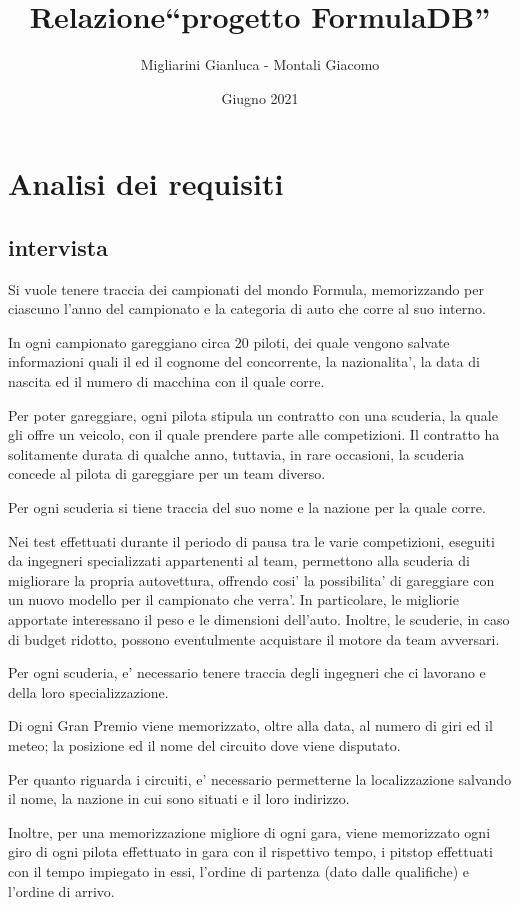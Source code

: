 \documentclass[a4paper,12pt]{report}
\title{Relazione\break``progetto FormulaDB''}
\author{Migliarini Gianluca - Montali Giacomo}
\date{Giugno 2021}
\begin{document}
	
\maketitle
\chapter{Analisi dei requisiti}
	\section{intervista}
		Si vuole tenere traccia dei campionati del mondo Formula, memorizzando per ciascuno l'anno del campionato e la categoria di auto che corre al suo interno.
		
		In ogni campionato gareggiano circa 20 piloti, dei quale vengono salvate informazioni quali il ed il cognome del concorrente,
		la nazionalita', la data di nascita ed il numero di macchina con il quale corre.
		
		Per poter gareggiare, ogni pilota stipula un contratto con una scuderia, la quale gli offre un veicolo, con il quale
		prendere parte alle competizioni. Il contratto ha solitamente durata di qualche anno, tuttavia, in rare occasioni,
		la scuderia concede al pilota di gareggiare per un team diverso.
		
		Per ogni scuderia si tiene traccia del suo nome e la nazione per la quale corre.
		
		Nei test effettuati durante il periodo di pausa tra le varie competizioni, eseguiti da ingegneri specializzati appartenenti al team,
		permettono alla scuderia di migliorare la propria autovettura, offrendo cosi' la possibilita' di gareggiare
		con un nuovo modello per il campionato che verra'. In particolare, le migliorie apportate interessano il peso e le dimensioni dell'auto.
		Inoltre, le scuderie, in caso di budget ridotto, possono eventulmente acquistare il motore da team avversari.
		
		Per ogni scuderia, e' necessario tenere traccia degli ingegneri che ci lavorano e della loro specializzazione.
		
		Di ogni Gran Premio viene memorizzato, oltre alla data, al numero di giri ed il meteo;
		la posizione ed il nome del circuito dove viene disputato.
		
		Per quanto riguarda i circuiti, e' necessario permetterne la localizzazione salvando il nome, la nazione in cui sono situati e il loro indirizzo.
		
		Inoltre, per una memorizzazione migliore di ogni gara, viene memorizzato ogni giro di ogni pilota effettuato in gara con il rispettivo tempo,
		i pitstop effettuati con il tempo impiegato in essi, l'ordine di partenza (dato dalle qualifiche) e l'ordine di arrivo.
		
\end{document}

